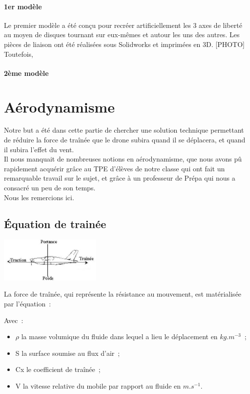 \documentclass[a4paper,11pt]{article}
\begin{document}
\paragraph{1er modèle}

Le premier modèle a été conçu pour recréer artificiellement les 3 axes de liberté au moyen de disques tournant sur eux-mêmes et autour les uns des autres. Les pièces de liaison ont été réalisées sous Solidworks et imprimées en 3D.
[PHOTO]
Toutefois,

\paragraph{2ème modèle}


\newpage

\section{Aérodynamisme}
	Notre but a été dans cette partie de chercher une solution technique permettant de réduire la force de traînée que le drone subira quand il se déplacera, et quand il subira l'effet du vent. \\
	Il nous manquait de nombreuses notions en aérodynamisme, que nous avons pû rapidement acquérir grâce au TPE d'élèves de notre classe qui ont fait un remarquable travail sur le sujet, et grâce à un professeur de Prépa qui nous a consacré un peu de son temps.\\
	Nous les remercions ici.
\subsection{Équation de trainée}
	\begin{center}
		\includegraphics[width=5cm]{../Images/portance.jpg}
	\end{center}
	La force de traînée, qui représente la résistance au mouvement, est matérialisée par l'équation~:\\
  \begin{center}
  \end{center}
  Avec~:
  \begin{itemize}
   \item $\rho$ la masse volumique du fluide dans lequel a lieu le déplacement en $kg.m^{-3}$~;
   \item S la surface soumise au flux d'air~;
   \item Cx le coefficient de traînée~;
   \item V la vitesse relative du mobile par rapport au fluide en $m.s^{-1}$.
  \end{itemize}
\end{document}
